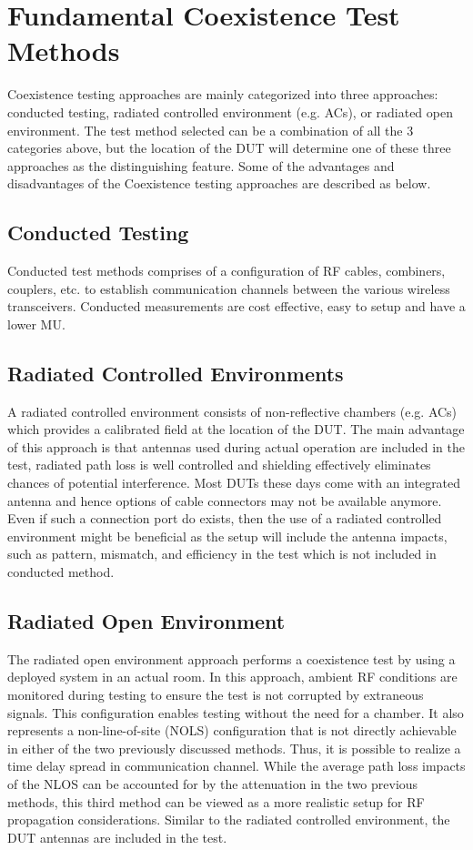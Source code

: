 \section{Fundamental Coexistence Test Methods}
Coexistence testing approaches are mainly categorized into three approaches: conducted testing, radiated controlled environment (e.g. \acsp{AC}), or radiated open environment. The test method selected can be a combination of all the 3 categories above, but the location of the \acs{DUT} will determine one of these three approaches as the distinguishing feature. Some of the advantages and disadvantages of the Coexistence testing approaches are described as below.

\subsection{Conducted Testing}
Conducted test methods comprises of a configuration of \acs{RF} cables, combiners, couplers, etc. to establish communication channels between the various wireless transceivers. Conducted measurements are cost effective, easy to setup and have a lower \acf{MU}.

\subsection{Radiated Controlled Environments}
A radiated controlled environment consists of non-reflective chambers (e.g. \acsp{AC}) which provides a calibrated field at the location of the \acs{DUT}. The main advantage of this approach is that antennas used during actual operation are included in the test, radiated path loss is well controlled and shielding effectively eliminates chances of potential interference. Most \acsp{DUT} these days come with an integrated antenna and hence options of cable connectors may not be available anymore. Even if such a connection port do exists, then the use of a radiated controlled environment might be beneficial as the setup will include the antenna impacts, such as pattern, mismatch, and efficiency in the test which is not included in conducted method.

\subsection{Radiated Open Environment}
The radiated open environment approach performs a coexistence test by using a deployed system in an actual room. In this approach, ambient \acs{RF} conditions are monitored during testing to ensure the test is not corrupted by extraneous signals. This configuration enables testing without the need for a chamber. It also represents a non-line-of-site (NOLS) configuration that is not directly achievable in either of the two previously discussed methods. Thus, it is possible to realize a time delay spread in communication channel. While the average path loss impacts of the NLOS can be accounted for by the attenuation in the two previous methods, this third method can be viewed as a more realistic setup for \acs{RF} propagation considerations. Similar to the radiated controlled environment, the \acs{DUT} antennas are included in the test. 

